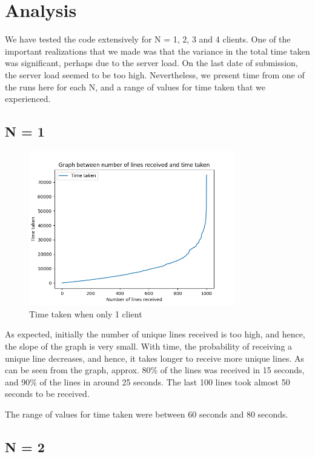 \documentclass[12pt]{scrartcl}
\begin{document}
\section{Analysis}

We have tested the code extensively for N = 1, 2, 3 and 4 clients. One of the important realizations that we made was that the variance in the total time taken was significant, perhaps due to the server load. On the last date of submission, the server load seemed to be too high. Nevertheless, we present time from one of the runs here for each N, and a range of values for time taken that we experienced. 

\subsection{N = 1}

\begin{figure}[H]
    \centering
    \includegraphics[width=0.8\textwidth]{images/latency_n_1.png}
    \caption{Time taken when only 1 client}
    \label{fig:my_label}
\end{figure}

As expected, initially the number of unique lines received is too high, and hence, the slope of the graph is very small. With time, the probability of receiving a unique line decreases, and hence, it takes longer to receive more unique lines. As can be seen from the graph, approx. 80\% of the lines was received in 15 seconds, and 90\% of the lines in around 25 seconds. The last 100 lines took almost 50 seconds to be received.

The range of values for time taken were between 60 seconds and 80 seconds.

\subsection{N = 2}
\end{document}
